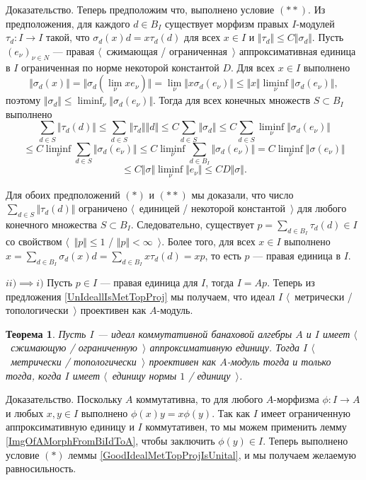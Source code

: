 \documentclass[12pt]{article}
\numberwithin{equation}{subsection}
\theoremstyle{plain}
\newtheorem{theorem}{Теорема}
\newenvironment{proof}{Доказательство.}{}
\begin{document}
\begin{fulltext}
\begin{proof}
Теперь предположим что, выполнено условие $(**)$. Из предположения, для каждого $d\in B_I$ существует морфизм правых $I$-модулей $\tau_d:I\to I$ такой, что $\sigma_d(x)d=x\tau_d(d)$ для всех $x\in I$ и $\Vert\tau_d\Vert\leq C\Vert\sigma_d\Vert$. Пусть $(e_\nu)_{\nu\in N}$ --- правая $\langle$~сжимающая / ограниченная~$\rangle$ аппроксимативная единица в $I$ ограниченная по норме некоторой константой $D$. Для всех $x\in I$ выполнено
$$
\Vert\sigma_d(x)\Vert
=\Vert\sigma_d(\lim_\nu x e_\nu)\Vert
=\lim_\nu\Vert x\sigma_d(e_\nu)\Vert
\leq\Vert x\Vert\liminf_\nu\Vert\sigma_d(e_\nu)\Vert,
$$
поэтому $\Vert\sigma_d\Vert\leq \liminf_\nu\Vert\sigma_d(e_\nu)\Vert$. Тогда для всех конечных множеств $S\subset B_I$ выполнено
$$
\sum_{d\in S}\Vert \tau_d(d)\Vert
\leq \sum_{d\in S}\Vert \tau_d\Vert\Vert d\Vert
\leq C\sum_{d\in S}\Vert \sigma_d\Vert
\leq C\sum_{d\in S}\liminf_\nu \Vert \sigma_d(e_\nu)\Vert
$$
$$
\leq C\liminf_{\nu}\sum_{d\in S}\Vert \sigma_d(e_\nu) \Vert
\leq C\liminf_{\nu}\sum_{d\in B_I}\Vert \sigma_d(e_\nu) \Vert
=C\liminf_{\nu}\Vert\sigma(e_\nu)\Vert
$$
$$
\leq C\Vert\sigma\Vert\liminf_{\nu}\Vert e_\nu\Vert
\leq CD\Vert\sigma\Vert.
$$

Для обоих предположений $(*)$ и $(**)$ мы доказали, что число $\sum_{d\in S}\Vert \tau_d(d)\Vert$ ограничено $\langle$~единицей / некоторой константой~$\rangle$ для любого конечного множества $S\subset B_I$. Следовательно, существует $p=\sum_{d\in B_I}\tau_d(d)\in I$ со свойством $\langle$~$\Vert p\Vert\leq 1$ / $\Vert p\Vert< \infty$~$\rangle$. Более того, для всех $x\in I$ выполнено $x=\sum_{d\in B_I}\sigma_d(x)d=\sum_{d\in B_I}x\tau_d(d)=xp$, то есть $p$ --- правая единица в $I$. 

$ii)$$\implies$$i)$ Пусть $p\in I$  --- правая единица для $I$, тогда $I=Ap$. Теперь из предложения \ref{UnIdeallIsMetTopProj} мы получаем, что идеал $I$ $\langle$~метрически / топологически~$\rangle$ проективен как $A$-модуль.
\end{proof}

\begin{theorem}\label{GoodCommIdealMetTopProjIsUnital} Пусть $I$ --- идеал коммутативной банаховой алгебры $A$ и $I$ имеет $\langle$~сжимающую / ограниченную~$\rangle$ аппроксимативную единицу. Тогда $I$ $\langle$~метрически / топологически~$\rangle$ проективен как $A$-модуль тогда и только тогда, когда $I$ имеет $\langle$~единицу нормы $1$ / единицу~$\rangle$.
\end{theorem} 
\begin{proof} Поскольку $A$ коммутативна, то для любого $A$-морфизма $\phi:I\to A$ и любых $x,y\in I$ выполнено $\phi(x)y=x\phi(y)$. Так как $I$ имеет ограниченную аппроксимативную единицу и $I$ коммутативен, то мы можем применить лемму \ref{ImgOfAMorphFromBiIdToA}, чтобы заключить $\phi(y)\in I$. Теперь выполнено условие $(*)$ леммы \ref{GoodIdealMetTopProjIsUnital}, и мы получаем желаемую равносильность.
\end{proof}


\end{fulltext}
\end{document}
